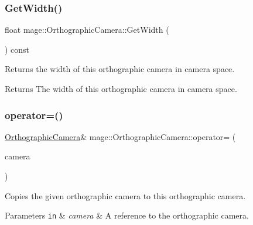 \subsubsection{\texorpdfstring{Get\+Width()}{GetWidth()}}
{\footnotesize\ttfamily float mage\+::\+Orthographic\+Camera\+::\+Get\+Width (\begin{DoxyParamCaption}{ }\end{DoxyParamCaption}) const}

Returns the width of this orthographic camera in camera space.

\begin{DoxyReturn}{Returns}
The width of this orthographic camera in camera space. 
\end{DoxyReturn}
\hypertarget{classmage_1_1_orthographic_camera_a38631b1c377f0e3b6fa99ac5535ce226}{}\label{classmage_1_1_orthographic_camera_a38631b1c377f0e3b6fa99ac5535ce226} 
\subsubsection{\texorpdfstring{operator=()}{operator=()}\hspace{0.1cm}{\footnotesize\ttfamily [1/2]}}
{\footnotesize\ttfamily \hyperlink{classmage_1_1_orthographic_camera}{Orthographic\+Camera}\& mage\+::\+Orthographic\+Camera\+::operator= (\begin{DoxyParamCaption}\item[{const \hyperlink{classmage_1_1_orthographic_camera}{Orthographic\+Camera} \&}]{camera }\end{DoxyParamCaption})\hspace{0.3cm}{\ttfamily [default]}}

Copies the given orthographic camera to this orthographic camera.


\begin{DoxyParams}[1]{Parameters}
\mbox{\tt in}  & {\em camera} & A reference to the orthographic camera. \\
\hline
\end{DoxyParams}
\hypertarget{classmage_1_1_orthographic_camera_a51b38eab8945fb1a2031a7ba1755d689}{}\label{classmage_1_1_orthographic_camera_a51b38eab8945fb1a2031a7ba1755d689} 

